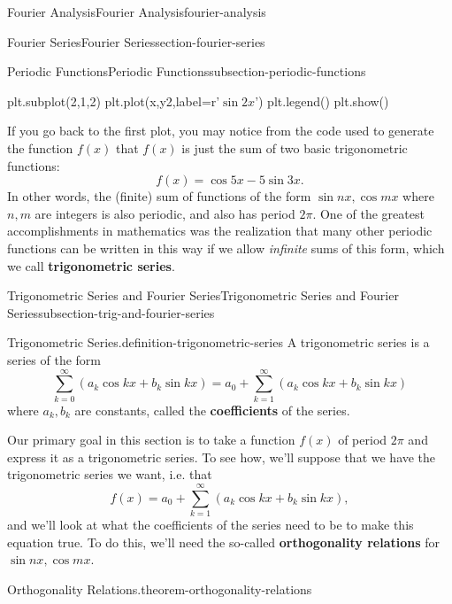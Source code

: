 \documentclass[oneside,10pt,]{book}
\newcommand{\terminology}[1]{\textbf{#1}}
\numberwithin{equation}{section}
\begin{document}
\begin{chapterptx}{Fourier Analysis}{}{Fourier Analysis}{}{}{fourier-analysis}
\begin{sectionptx}{Fourier Series}{}{Fourier Series}{}{}{section-fourier-series}
\begin{subsectionptx}{Periodic Functions}{}{Periodic Functions}{}{}{subsection-periodic-functions}
\begin{sageinput}
plt.subplot(2,1,2)
plt.plot(x,y2,label=r'$\sin2x$')
plt.legend()
plt.show()
\end{sageinput}
\hypertarget{p-576}{}%
If you go back to the first plot, you may notice from the code used to generate the function \(f(x)\) that \(f(x)\) is just the sum of two basic trigonometric functions:%
\begin{equation*}
f(x) = \cos5x-5\sin3x.
\end{equation*}
In other words, the (finite) sum of functions of the form \(\sin nx,\cos mx\) where \(n,m\) are integers is also periodic, and also has period \(2\pi\). One of the greatest accomplishments in mathematics was the realization that many other periodic functions can be written in this way if we allow \emph{infinite} sums of this form, which we call \terminology{trigonometric series}.%
\end{subsectionptx}
%
%
\typeout{************************************************}
\typeout{************************************************}
%
\begin{subsectionptx}{Trigonometric Series and Fourier Series}{}{Trigonometric Series and Fourier Series}{}{}{subsection-trig-and-fourier-series}
\begin{definition}{Trigonometric Series.}{definition-trigonometric-series}%
\hypertarget{p-577}{}%
A trigonometric series is a series of the form%
\begin{equation*}
\sum_{k=0}^{\infty}(a_{k}\cos kx+b_{k}\sin kx) = a_{0} + \sum_{k=1}^{\infty}(a_{k}\cos kx+b_{k}\sin kx)
\end{equation*}
where \(a_{k},b_{k}\) are constants, called the \terminology{coefficients} of the series.%
\end{definition}
\hypertarget{p-578}{}%
Our primary goal in this section is to take a function \(f(x)\) of period \(2\pi\) and express it as a trigonometric series. To see how, we'll suppose that we have the trigonometric series we want, i.e. that%
\begin{equation*}
f(x) = a_{0} + \sum_{k=1}^{\infty}(a_{k}\cos kx+b_{k}\sin kx),
\end{equation*}
and we'll look at what the coefficients of the series need to be to make this equation true. To do this, we'll need the so-called \terminology{orthogonality relations} for \(\sin nx,\cos mx\).%
\begin{theorem}{Orthogonality Relations.}{}{theorem-orthogonality-relations}%
\hypertarget{p-579}{}%

\end{theorem}
\end{subsectionptx}
\end{sectionptx}
\end{chapterptx}
\end{document}
